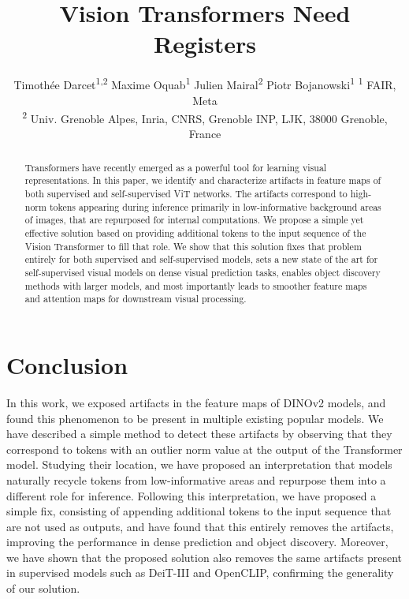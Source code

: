 \documentclass{article} %
\title{
  \centering
  Vision Transformers Need Registers
}
\author{
Timothée Darcet\textsuperscript{1,2} \And
Maxime Oquab\textsuperscript{1} \And
Julien Mairal\textsuperscript{2} \And
Piotr Bojanowski\textsuperscript{1} \And
\normalfont
\textsuperscript{1} FAIR, Meta \\
\textsuperscript{2} Univ. Grenoble Alpes, Inria, CNRS, Grenoble INP, LJK, 38000 Grenoble, France \\
}
\makeatletter
\def\blfootnote{\gdef\@thefnmark{}\@footnotetext}
\newcommand{\new}[1]{{#1}}
\newcommand{\old}[1]{}
\makeatother
\begin{document}
  
\maketitle
\blfootnote{Correspondence to \texttt{timdarcet@meta.com}}

\begin{abstract}

  Transformers have recently emerged as a powerful tool for learning visual representations. 
  In this paper, we identify and characterize artifacts in feature maps of both supervised 
  and self-supervised ViT networks. The artifacts correspond to high-norm tokens appearing 
  during inference primarily in low-informative background areas of images, that are 
  repurposed for internal computations. We propose a simple yet effective solution based on 
  providing additional tokens to the input sequence of the Vision Transformer to fill that 
  role. We show that this solution fixes that problem entirely for both supervised and 
  self-supervised models, sets a new state of the art for self-supervised visual models on 
  dense visual prediction tasks, enables object discovery methods with larger 
  models, and most importantly leads to smoother feature maps and attention maps for downstream visual 
  processing.
\end{abstract}
















\section{Conclusion}
In this work, we exposed artifacts in the feature maps of DINOv2 models, and found this phenomenon to 
be present in multiple existing popular models. We \new{have} described a simple method to detect these artifacts 
by observing that they correspond to tokens with an outlier norm value at the output of the Transformer 
model. Studying their location, we \new{have} proposed an interpretation that models naturally recycle tokens 
from low-informative areas and repurpose them into a different role for inference. Following this 
interpretation, we \new{have} proposed a simple fix, consisting of appending additional tokens to the input sequence 
that are not used as outputs, and \new{have} found that this entirely removes the artifacts, improving the 
performance in dense prediction and object discovery. Moreover, we \new{have shown}\old{showed} that the proposed solution also 
removes the same artifacts present in supervised models such as DeiT-III and OpenCLIP, confirming the generality of our solution. 
\end{document}
